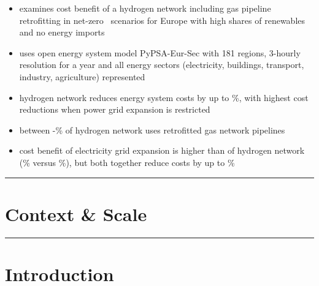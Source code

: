 \documentclass[11pt,preprint]{elsarticle}
\newcommand{\co}{\ce{CO2}~}
\begin{document}

\begin{itemize}
	\item examines cost benefit of a hydrogen network including gas pipeline retrofitting in net-zero \co scenarios for Europe with high shares of renewables and no energy imports
	\item uses open energy system model PyPSA-Eur-Sec with 181 regions, 3-hourly resolution for a year and all energy sectors (electricity, buildings, transport, industry, agriculture) represented
	\item hydrogen network reduces energy system costs by up to \maxhybenefitrel\%, with highest cost reductions when power grid expansion is restricted
	\item between \minretroshare-\maxretroshare\% of hydrogen network uses retrofitted gas network pipelines
	\item cost benefit of electricity grid expansion is higher than of hydrogen network (\maxacbenefitrel\% versus \maxhybenefitrel\%), but both together reduce costs by up to \gridbenefitrel\%
\end{itemize}

\par\noindent\rule{\textwidth}{0.4pt}

\section*{Context \& Scale}



\par\noindent\rule{\textwidth}{0.4pt}




\newpage
\section*{Introduction}
\label{sec:intro}
\end{document}
